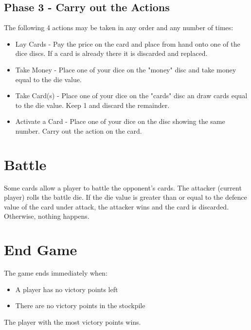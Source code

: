 \documentclass[12pt]{article}
\newenvironment{itemizeCustom}
{\begin{itemize}
  \setlength{\itemsep}{1pt}
  \setlength{\parskip}{0pt}
  \setlength{\parsep}{0pt}}
{\end{itemize}}
\begin{document}
\begin{mdframed}[style = customFrame]
\begin{multicols*}{2}
\subsection*{Phase 3 - Carry out the Actions}
The following 4 actions may be taken in any order and any number of times:
\begin{itemizeCustom}
    \item Lay Cards - Pay the price on the card and place from hand onto one of the dice discs. If a card is already there it is discarded and replaced.
    \item Take Money - Place one of your dice on the "money" disc and take money equal to the die value.
    \item Take Card(s) - Place one of your dice on the "cards" disc an draw cards equal to the die value. Keep 1 and discard the remainder.
    \item Activate a Card - Place one of your dice on the disc showing the same number. Carry out the action on the card.
\end{itemizeCustom}

\section*{Battle}
Some cards allow a player to battle the opponent's cards. The attacker (current player) rolls the battle die. If the die value is greater than or equal to the defence value of the card under attack, the attacker wins and the card is discarded. Otherwise, nothing happens.

\section*{End Game}
The game ends immediately when:
\begin{itemizeCustom}
    \item A player has no victory points left
    \item There are no victory points in the stockpile
\end{itemizeCustom}

The player with the most victory points wins.

\end{multicols*}
\end{mdframed}
\end{document}
